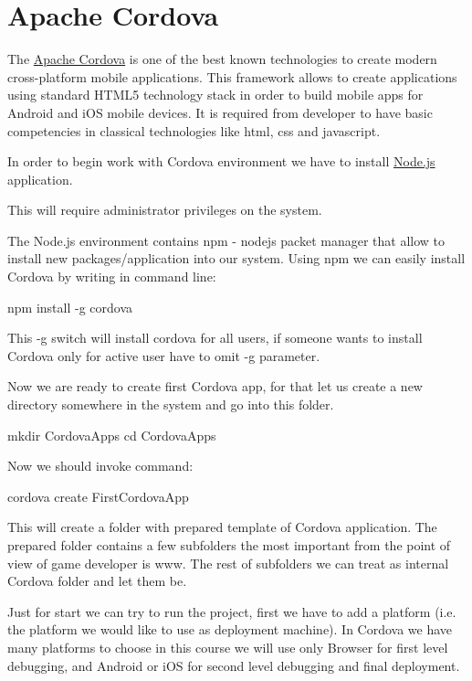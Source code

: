 \chapter{Apache Cordova}

The \href{https://cordova.apache.org}{Apache Cordova} is one of the best known technologies to create modern cross-platform mobile applications. This framework allows to create applications using standard HTML5 technology stack in order to build mobile apps for Android and iOS mobile devices. It is required from developer to have basic competencies in classical technologies like html, css and javascript.

In order to begin work with Cordova environment we have to install \href{http://nodejs.org}{Node.js} application. \begin{warning} This will require administrator privileges on the system.\end{warning} The Node.js environment contains npm - nodejs packet manager that allow to install new packages/application into our system. Using npm we can easily install Cordova by writing in command line:

\begin{shell}
npm install -g cordova
\end{shell}

This -g switch will install cordova for all users, if someone wants to install Cordova only for active user have to omit -g parameter.

Now we are ready to create first Cordova app, for that let us create a new directory somewhere in the system and go into this folder.

\begin{shell}
mkdir CordovaApps
cd CordovaApps
\end{shell}

Now we should invoke command:
\begin{shell}
cordova create FirstCordovaApp
\end{shell}

This will create a folder with prepared template of Cordova application. The prepared folder contains a few subfolders the most important from the point of view of game developer is www. The rest of subfolders we can treat as internal Cordova folder and let them be.

Just for start we can try to run the project, first we have to add a platform (i.e. the platform we would like to use as deployment machine). In Cordova we have many platforms to choose in this course we will use only Browser for first level debugging, and Android or iOS for second level debugging and final deployment.

